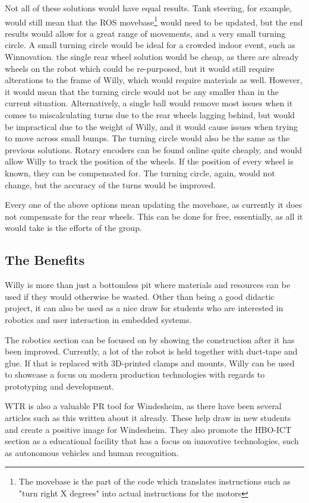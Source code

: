 Not all of these solutions would have equal results.
Tank steering, for example, would still mean that the ROS movebase\footnote{The movebase is the part of the code which translates instructions such as "turn right X degrees" into actual instructions for the motors} would need to be updated, but the end results would allow for a great range of movements, and a very small turning circle.
A small turning circle would be ideal for a crowded indoor event, such as Winnovation.
the single rear wheel solution would be cheap, as there are already wheels on the robot which could be re-purposed, but it would still require alterations to the frame of Willy, which would require materials as well.
However, it would mean that the turning circle would not be any smaller than in the current situation.
Alternatively, a single ball would remove most issues when it comes to miscalculating turns due to the rear wheels lagging behind, but would be impractical due to the weight of Willy, and it would cause issues when trying to move across small bumps.
The turning circle would also be the same as the previous solutions.
Rotary encoders can be found online quite cheaply, and would allow Willy to track the position of the wheels.
If the position of every wheel is known, they can be compensated for.
The turning circle, again, would not change, but the accuracy of the turns would be improved.

Every one of the above options mean updating the movebase, as currently it does not compensate for the rear wheels.
This can be done for free, essentially, as all it would take is the efforts of the group.
\clearpage
\subsection{The Benefits}
Willy is more than just a bottomless pit where materials and resources can be used if they would otherwise be wasted.
Other than being a good didactic project, it can also be used as a nice draw for students who are interested in robotics and user interaction in embedded systems.

The robotics section can be focused on by showing the construction after it has been improved.
Currently, a lot of the robot is held together with duct-tape and glue.
If that is replaced with 3D-printed clamps and mounts, Willy can be used to showcase a focus on modern production technologies with regards to prototyping and development.

WTR is also a valuable PR tool for Windesheim, as there have been several articles such as this \cite{stentorwilly} written about it already.
These help draw in new students and create a positive image for Windesheim.
They also promote the HBO-ICT section as a educational facility that has a focus on innovative technologies, such as autonomous vehicles and human recognition.

